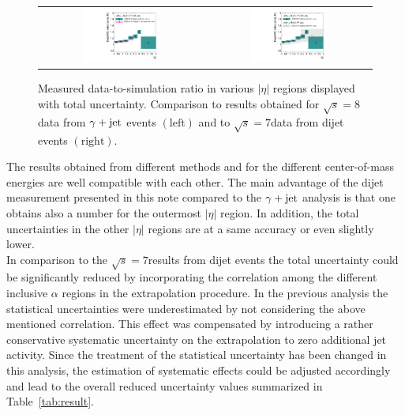 \begin{figure}[!hp]
  \centering
  \begin{tabular}{cc}
                \includegraphics[width=0.49\textwidth]{figures/JER_2012_compPhoton_final_combination_v1.pdf} &
                \includegraphics[width=0.49\textwidth]{figures/JER_2012_comp2011_final_combination_v1.pdf}
  \end{tabular}
  \caption{Measured data-to-simulation ratio in various $|\eta|$ regions displayed with total uncertainty. Comparison to results obtained for $\sqrt{s}=8$\tev data from $\gamma +\rm{jet}$ events $(\mathrm{left})$ and to $\sqrt{s}=7$\tev data from dijet events $(\mathrm{right})$.}
  \label{fig:result_comparison}
\end{figure}

The results obtained from different methods and for the different center-of-mass energies are well compatible with each other. The main advantage of the dijet measurement presented in this note compared to the $\gamma +\rm{jet}$ analysis is that one obtains also a number for the outermost $|\eta|$ region. In addition, the total uncertainties in the other $|\eta|$ regions are at a same accuracy or even slightly lower. \\
In comparison to the $\sqrt{s}=7$\tev results from dijet events the total uncertainty could be significantly reduced by incorporating the correlation among the different inclusive $\alpha$ regions in the extrapolation procedure. In the previous analysis the statistical uncertainties were underestimated by not considering the above mentioned correlation. This effect was compensated by introducing a rather conservative systematic uncertainty on the extrapolation to zero additional jet activity. Since the treatment of the statistical uncertainty has been changed in this analysis, the estimation of systematic effects could be adjusted accordingly and lead to the overall reduced uncertainty values summarized in Table~\ref{tab:result}.

